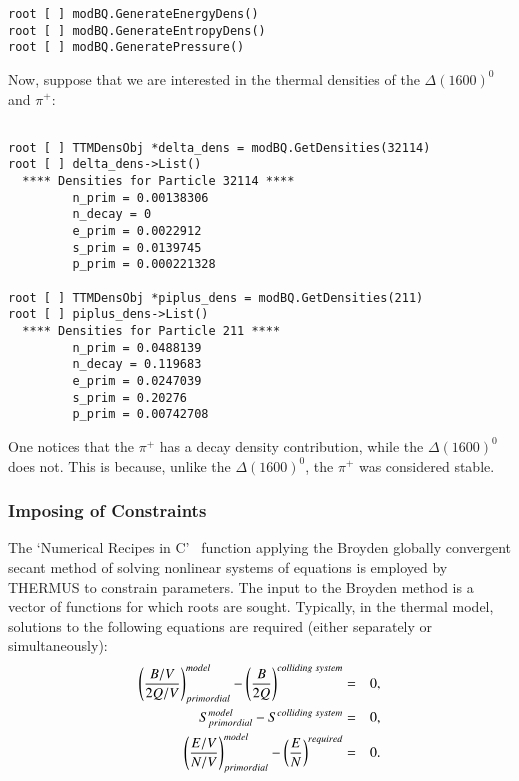 \documentclass{elsarticle}
\begin{document}
\small
\begin{verbatim}
root [ ] modBQ.GenerateEnergyDens()
root [ ] modBQ.GenerateEntropyDens()
root [ ] modBQ.GeneratePressure()
\end{verbatim}
\normalsize

\noindent
Now, suppose that we are interested in the thermal densities of the 
$\Delta(1600)^0$ and $\pi^+$:

\small
\begin{verbatim}

root [ ] TTMDensObj *delta_dens = modBQ.GetDensities(32114)
root [ ] delta_dens->List()
  **** Densities for Particle 32114 ****
         n_prim = 0.00138306
         n_decay = 0
         e_prim = 0.0022912
         s_prim = 0.0139745
         p_prim = 0.000221328

root [ ] TTMDensObj *piplus_dens = modBQ.GetDensities(211)
root [ ] piplus_dens->List()
  **** Densities for Particle 211 ****
         n_prim = 0.0488139
         n_decay = 0.119683
         e_prim = 0.0247039
         s_prim = 0.20276
         p_prim = 0.00742708

\end{verbatim}
\normalsize

\noindent
One notices that the $\pi^+$ has a decay density contribution, while the $\Delta(1600)^0$ does not. 
This is because, unlike the $\Delta(1600)^0$, the $\pi^+$ was considered stable.\\

\subsubsection{Imposing of Constraints}

The `Numerical Recipes in C'~\cite{Press:2007nrc} function applying the Broyden globally
convergent secant method of solving nonlinear systems of equations is
employed by THERMUS to constrain parameters. The input to the Broyden 
method is a vector of functions for which roots are sought. Typically, 
in the thermal model, solutions to the following equations 
are required (either separately or simultaneously):\\  
\begin{eqnarray*}
\left({B/V \over 2Q/V}\right)_{primordial}^{model} - \left({B \over 2Q}\right)^{colliding\;system} &=& 0,\\
S_{primordial}^{model} - S^{colliding\;system} &=& 0,\\
\left({E/V \over N/V}\right)_{primordial}^{model} - \left(E \over N\right)^{required} &=& 0.
\end{eqnarray*}
\end{document}
